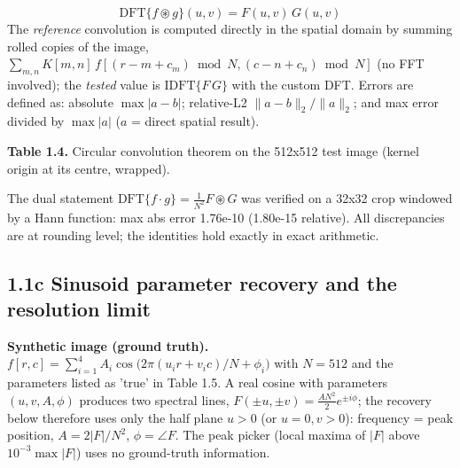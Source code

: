 \documentclass[10pt,a4paper]{article}
\begin{document}
\begin{equation}\mathrm{DFT}\{f\circledast g\}(u,v)=F(u,v)\,G(u,v)\end{equation}
The \textit{reference} convolution is computed directly in the spatial domain by summing rolled copies of the image, $\sum_{m,n}K[m,n]\,f[(r-m+c_m) \bmod N,(c-n+c_n) \bmod N]$ (no FFT involved); the \textit{tested} value is $\mathrm{IDFT}\{F\,G\}$ with the custom DFT. Errors are defined as: absolute $\max|a-b|$; relative-L2 $\|a-b\|_2/\|a\|_2$; and max error divided by $\max|a|$ ($a$ = direct spatial result).

\begin{table}[H]\centering\footnotesize{\small\textbf{Table 1.4.} Circular convolution theorem on the 512x512 test image (kernel origin at its centre, wrapped).\par}\vskip 3pt
\end{table}
The dual statement $\mathrm{DFT}\{f\cdot g\}=\frac{1}{N^2}F\circledast G$ was verified on a 32x32 crop windowed by a Hann function: max abs error 1.76e-10 (1.80e-15 relative). All discrepancies are at rounding level; the identities hold exactly in exact arithmetic.

\subsection{1.1c Sinusoid parameter recovery and the resolution limit}
\textbf{Synthetic image (ground truth).} $f[r,c]=\sum_{i=1}^{4} A_i\cos\!\big(2\pi(u_i r+v_i c)/N+\phi_i\big)$ with $N=512$ and the parameters listed as 'true' in Table 1.5. A real cosine with parameters $(u,v,A,\phi)$ produces two spectral lines, $F(\pm u,\pm v)=\frac{AN^2}{2}e^{\pm i\phi}$; the recovery below therefore uses only the half plane $u>0$ (or $u=0,v>0$): frequency = peak position, $A=2|F|/N^2$, $\phi=\angle F$. The peak picker (local maxima of $|F|$ above $10^{-3}\max|F|$) uses no ground-truth information.
\end{document}
